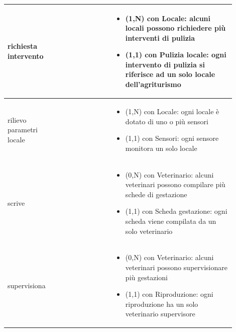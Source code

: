 \documentclass[12pt,a4paper]{article}
\begin{document}
\begin{center}
\begin{longtable}{|p{0.16\linewidth}|p{0.24\linewidth}|p{0.50\linewidth}|}
\hline
richiesta intervento 				&   
					& \begin{itemize}
						\setlength{\itemindent}{-1em}
						\vspace{-25pt}
						\setlength\itemsep{-0.25em}
						\item (1,N) con Locale: alcuni locali possono richiedere più interventi di pulizia
						\item (1,1) con Pulizia locale: ogni intervento di pulizia si riferisce ad un solo locale dell'agriturismo
					\end{itemize}\\ 

\hline
rilievo parametri locale 				&   
					& \begin{itemize}
						\setlength{\itemindent}{-1em}
						\vspace{-25pt}
						\setlength\itemsep{-0.25em}
						\item (1,N) con Locale: ogni locale è dotato di uno o più sensori
						\item (1,1) con Sensori: ogni sensore monitora un solo locale
					\end{itemize}\\ 

\hline
scrive				&   
					& \begin{itemize}
						\setlength{\itemindent}{-1em}
						\vspace{-25pt}
						\setlength\itemsep{-0.25em}
						\item (0,N) con Veterinario: alcuni veterinari possono compilare più schede di gestazione
						\item (1,1) con Scheda gestazione: ogni scheda viene compilata da un solo veterinario
					\end{itemize}\\ 

\hline
supervisiona				&   
					& \begin{itemize}
						\setlength{\itemindent}{-1em}
						\vspace{-25pt}
						\setlength\itemsep{-0.25em}
						\item (0,N) con Veterinario: alcuni veterinari possono supervisionare più gestazioni
						\item (1,1) con Riproduzione: ogni riproduzione ha un solo veterinario supervisore
					\end{itemize}\\ 

\hline

\end{longtable}
\end{center}
\pagebreak
\end{document}
